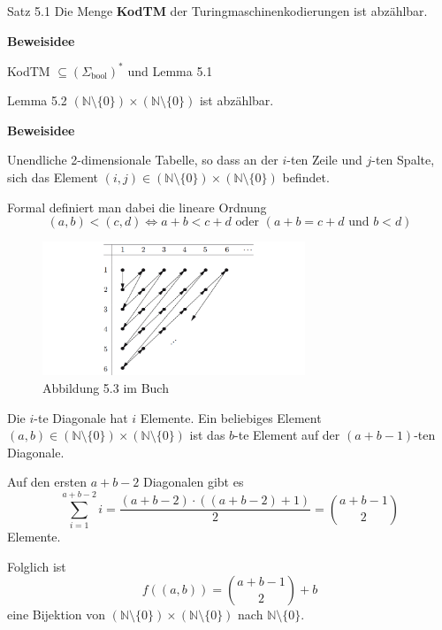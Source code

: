 \documentclass[a4paper, 11pt]{article}
\def\N{\mathbb{N}}
\begin{document}
            \begin{mainbox}{Satz 5.1}
                Die Menge \textbf{KodTM} der Turingmaschinenkodierungen ist abzählbar.
            \end{mainbox}
            \textbf{Beweisidee}
        
            KodTM $\subseteq (\Sigma_{\text{bool}})^*$ und Lemma 5.1
        
            \begin{mainbox}{Lemma 5.2}
                $(\N\setminus\{0\}) \times (\N \setminus \{0\})$ ist abzählbar.
            \end{mainbox}
            \textbf{Beweisidee}
        
            Unendliche 2-dimensionale Tabelle, so dass an der $i$-ten Zeile und $j$-ten Spalte, sich das Element $(i,j) \in (\N\setminus\{0\}) \times (\N \setminus \{0\})$ befindet.
        
            Formal definiert man dabei die lineare Ordnung 
            $$(a,b) < (c,d) \iff a+b < c+d \text{ oder }(a+b = c+d \text{ und } b <d)$$
        
            \begin{figure}[htp]
                \includegraphics[width=0.7\textwidth]{Images/Abzählen.png}
                \caption{Abbildung 5.3 im Buch}
            \end{figure}
        
            Die $i$-te Diagonale hat $i$ Elemente. Ein beliebiges Element $(a,b) \in (\N\setminus\{0\}) \times (\N \setminus \{0\})$ ist das $b$-te Element auf der $(a+b-1)$-ten Diagonale.
            
            Auf den ersten $a+b-2$ Diagonalen gibt es 
            $$\sum_{i = 1}^{a+b-2}i = \frac{(a+b-2)\cdot((a+b-2)+1)}{2} = \binom{a+b-1}{2}$$
            Elemente.
        
            Folglich ist 
            $$f((a,b)) = \binom{a+b-1}{2} + b$$
            eine Bijektion von $(\N\setminus\{0\}) \times (\N \setminus \{0\})$ nach $\N\setminus\{0\}$.
        
\end{document}
